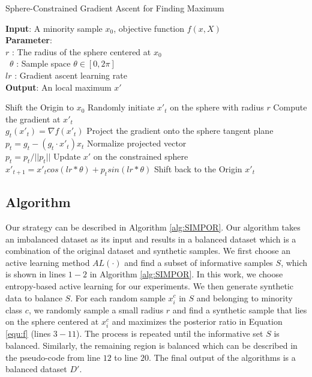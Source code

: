 \begin{algorithm}[h]
	\caption{Sphere-Constrained Gradient Ascent for Finding Maximum}
	
	\begin{flushleft}
		\textbf{Input}: A minority sample $x_0$, objective function $f(x,X)$\\
		\textbf{Parameter}: \\
		$r$ : The radius of the sphere centered at $x_0$  \\\
		$\theta$ : Sample space $\theta \in [0,2\pi]$ \\
		$lr$ : Gradient ascent learning rate\\
		
		\textbf{Output}: An local maximum $x'$\\
		\begin{algorithmic}[1]
			\STATE Shift the Origin to $x_0$
			\STATE Randomly initiate $x'_t$ on the sphere with radius $r$	
			\STATE Compute the gradient at $x'_t$\\
			$g_t(x'_t) = \nabla f(x'_t)$
			\STATE Project the gradient onto the sphere tangent plane\\
			$p_t = g_t - (g_t \cdot x'_t) x_t$
			\STATE Normalize projected vector\\
			$p_t = p_t/ ||p_t||$
			\STATE Update $x'$ on the constrained sphere \\
			$x'_{t+1} = x'_t cos(lr*\theta) + p_t sin (lr*\theta)$ 			
			\ENDWHILE
			\STATE Shift back to the Origin
			\RETURN $x'_t$
		\end{algorithmic}
	\end{flushleft}
	\label{alg:optimization}
\end{algorithm}

\subsection{Algorithm}
Our strategy can be described in Algorithm \ref{alg:SIMPOR}. Our algorithm takes an imbalanced dataset as its input and results in a balanced dataset which is a combination of the original dataset and synthetic samples. We first choose an active learning method $AL(\cdot)$ and find a subset of informative samples $S$, which is shown in lines $1-2$ in Algorithm \ref{alg:SIMPOR}. In this work, we choose entropy-based active learning for our experiments. We then generate synthetic data to balance $S$. For each random sample $x_i^c$ in $S$ and belonging to minority class $c$, we randomly sample a small radius $r$ and find a synthetic sample that lies on the sphere centered at $x_i^c$ and maximizes the posterior ratio in Equation \ref{equ:f} (lines $3-11$). The process is repeated until the informative set $S$ is balanced. Similarly, the remaining region is balanced which can be described in the pseudo-code from line $12$ to line $20$. The final output of the algorithms is a balanced dataset $D'$.       

